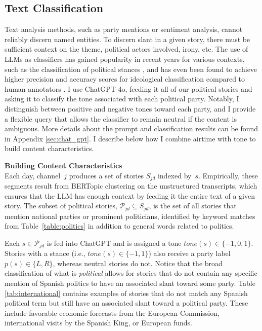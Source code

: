 \documentclass[12pt]{article}
\begin{document}
	\subsection{Text Classification}
	
	Text analysis methods, such as party mentions or sentiment analysis, cannot reliably discern named entities. To discern slant in a given story, there must be sufficient context on the theme, political actors involved, irony, etc. The use of LLMs as classifiers has gained popularity in recent years for various contexts, such as the classification of political stances \citep{lemens}, and has even been found to achieve higher precision and accuracy scores for ideological classification compared to human annotators \citep{tornberg2023}. I use ChatGPT-4o, feeding it all of our political stories and asking it to classify the tone associated with each political party. Notably, I distinguish between positive and negative tones toward each party, and I provide a flexible query that allows the classifier to remain neutral if the content is ambiguous. More details about the prompt and classification results can be found in Appendix \ref{sec:chat_gpt}. I describe below how I combine airtime with tone to build content characteristics.
	
	\textbf{Building Content Characteristics}\\
	Each day, channel~$j$ produces a set of stories $S_{jd}$ indexed by~$s$. Empirically, these segments result from BERTopic clustering on the unstructured transcripts, which ensures that the LLM has enough context by feeding it the entire text of a given story. The subset of political stories, $\mathcal{P}_{jd} \subseteq S_{jd}$, is the set of all stories that mention national parties or prominent politicians, identified by keyword matches from Table~\ref{table:politics} in addition to general words related to politics.
	
	Each $s \in \mathcal{P}_{jd}$ is fed into ChatGPT and is assigned a tone $tone(s) \in \{-1,0,1\}$. Stories with a stance (i.e., $tone(s) \in \{-1,1\}$) also receive a party label $p(s) \in \{L,R\}$, whereas neutral stories do not. Notice that the broad classification of what is \textit{political} allows for stories that do not contain any specific mention of Spanish politics to have an associated slant toward some party. Table \ref{tab:international} contains examples of stories that do not match any Spanish political term but still have an associated slant toward a political party. These include favorable economic forecasts from the European Commission, international visits by the Spanish King, or European funds.
	
\end{document}
